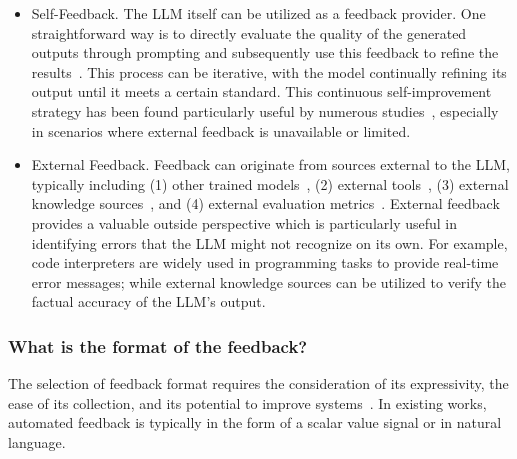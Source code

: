 \documentclass[12pt]{extarticle}
\begin{document}
\begin{itemize}
    \item Self-Feedback. The LLM itself can be utilized as a feedback provider. One straightforward way is to directly evaluate the quality of the generated outputs through prompting and subsequently use this feedback to refine the results~\cite{madaan2023selfrefine, shinn2023reflexion}. This process can be iterative, with the model continually refining its output until it meets a certain standard. This continuous self-improvement strategy has been found particularly useful by numerous studies~\cite{selfee2023, yan-etal-2023-learning}, especially in scenarios where external feedback is unavailable or limited.

    \item External Feedback. Feedback can originate from sources external to the LLM, typically including (1) other trained models~\cite{yan-etal-2023-learning, lightman2023lets}, (2) external tools~\cite{gou2023critic, charalambous2023new}, (3) external knowledge sources~\cite{gao2023rarr, yu2023improving}, and (4) external evaluation metrics~\cite{jung-etal-2022-maieutic, welleck2022generating}. External feedback provides a valuable outside perspective which is particularly useful in identifying errors that the LLM might not recognize on its own. For example, code interpreters are widely used in programming tasks to provide real-time error messages; while external knowledge sources can be utilized to verify the factual accuracy of the LLM's output.
\end{itemize}

\subsubsection{What is the format of the feedback?}
The selection of feedback format requires the consideration of its expressivity, the ease of its collection, and its potential to improve systems~\cite{fernandes2023bridging}. In existing works, automated feedback is typically in the form of a scalar value signal or in natural language.
\end{document}
